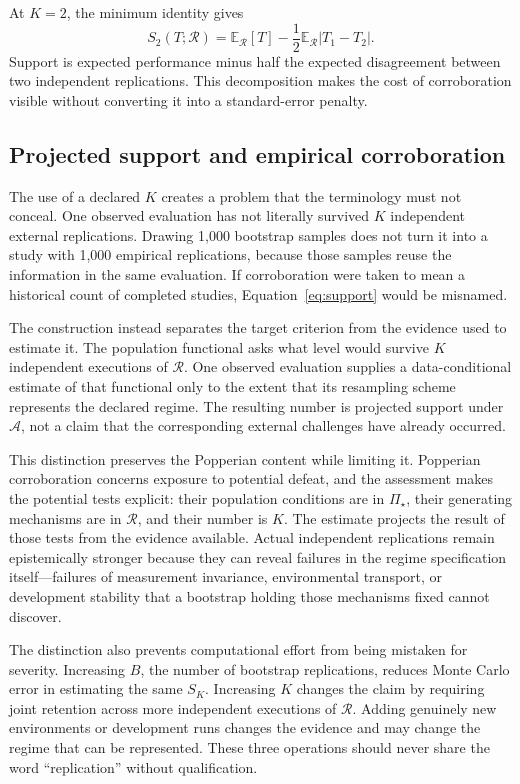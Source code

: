 \documentclass[11pt]{article}
\newcommand{\Regime}{\mathcal{R}}
\newcommand{\Assess}{\mathcal{A}}
\newcommand{\PSet}{\Pi_\star}
\newcommand{\E}{\mathbb{E}}
\theoremstyle{remark}
\begin{document}
At $K=2$, the minimum identity gives
\begin{equation}
S_2(T;\Regime)
=
\E_{\Regime}[T]
-
\frac12\E_{\Regime}|T_1-T_2|.
\label{eq:k2}
\end{equation}
Support is expected performance minus half the expected disagreement between two independent replications. This decomposition makes the cost of corroboration visible without converting it into a standard-error penalty.

\subsection{Projected support and empirical corroboration}

The use of a declared $K$ creates a problem that the terminology must not conceal. One observed evaluation has not literally survived $K$ independent external replications. Drawing 1,000 bootstrap samples does not turn it into a study with 1,000 empirical replications, because those samples reuse the information in the same evaluation. If corroboration were taken to mean a historical count of completed studies, Equation~\eqref{eq:support} would be misnamed.

The construction instead separates the target criterion from the evidence used to estimate it. The population functional asks what level would survive $K$ independent executions of $\Regime$. One observed evaluation supplies a data-conditional estimate of that functional only to the extent that its resampling scheme represents the declared regime. The resulting number is projected support under $\Assess$, not a claim that the corresponding external challenges have already occurred.

This distinction preserves the Popperian content while limiting it. Popperian corroboration concerns exposure to potential defeat, and the assessment makes the potential tests explicit: their population conditions are in $\PSet$, their generating mechanisms are in $\Regime$, and their number is $K$. The estimate projects the result of those tests from the evidence available. Actual independent replications remain epistemically stronger because they can reveal failures in the regime specification itself---failures of measurement invariance, environmental transport, or development stability that a bootstrap holding those mechanisms fixed cannot discover.

The distinction also prevents computational effort from being mistaken for severity. Increasing $B$, the number of bootstrap replications, reduces Monte Carlo error in estimating the same $S_K$. Increasing $K$ changes the claim by requiring joint retention across more independent executions of $\Regime$. Adding genuinely new environments or development runs changes the evidence and may change the regime that can be represented. These three operations should never share the word ``replication'' without qualification.
\end{document}

